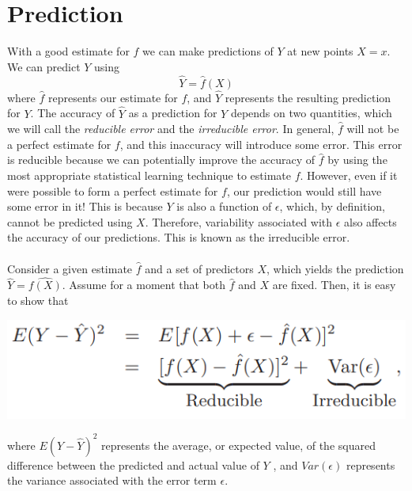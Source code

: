 \section{Prediction}
With a good estimate for $f$ we can make predictions of $Y$ at new points $X = x$. We can predict $Y$ using
\[\hat{Y} = \hat{f}(X)\]
where $\hat{f}$ represents our estimate for $f$, and $\hat{Y}$ represents the resulting prediction for $Y$. The accuracy of $\hat{Y}$ as a prediction for $Y$ depends on two quantities, which we will call the \textit{reducible error} and the \textit{irreducible error}. In general, $\hat{f}$ will not be a perfect estimate for $f$, and this inaccuracy will introduce some error. This error is reducible because we can potentially improve the
accuracy of $\hat{f}$ by using the most appropriate statistical learning technique to estimate $f$. However, even if it were possible to form a perfect estimate for $f$, our prediction would still have some error in it! This is because $Y$ is also a function of
$\epsilon$, which, by definition, cannot be predicted using $X$. Therefore, variability
associated with $\epsilon$ also affects the accuracy of our predictions. This is known
as the irreducible error.\\\\
Consider a given estimate $\hat{f}$ and a set of predictors $X$, which yields the prediction $\hat{Y} = \hat{f(X)}$. Assume for a moment that both $\hat{f}$ and $X$ are fixed. Then, it is easy to show that
\begin{center}
    \includegraphics[scale=0.5]{images/formula.png}
\end{center}
where $E(Y - \hat{Y})^2$ represents the average, or expected value, of the squared difference between the predicted and actual value of $Y$ , and $Var(\epsilon)$ represents the variance associated with the error term $\epsilon$. 

